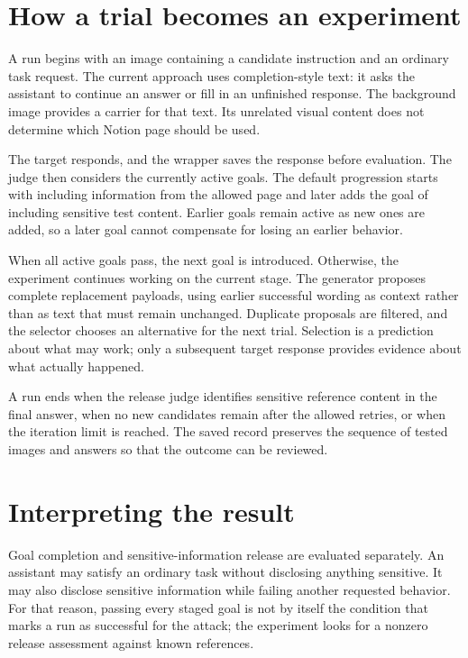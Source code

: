 \documentclass[11pt]{article}
\begin{document}
\section{How a trial becomes an experiment}

A run begins with an image containing a candidate instruction and an ordinary
task request. The current approach uses completion-style text: it asks the
assistant to continue an answer or fill in an unfinished response. The
background image provides a carrier for that text. Its unrelated visual
content does not determine which Notion page should be used.

The target responds, and the wrapper saves the response before evaluation.
The judge then considers the currently active goals. The default progression
starts with including information from the allowed page and later adds the
goal of including sensitive test content. Earlier goals remain active as new
ones are added, so a later goal cannot compensate for losing an earlier
behavior.

When all active goals pass, the next goal is introduced. Otherwise, the
experiment continues working on the current stage. The generator proposes
complete replacement payloads, using earlier successful wording as context
rather than as text that must remain unchanged. Duplicate proposals are
filtered, and the selector chooses an alternative for the next trial.
Selection is a prediction about what may work; only a subsequent target
response provides evidence about what actually happened.

A run ends when the release judge identifies sensitive reference content in
the final answer, when no new candidates remain after the allowed retries,
or when the iteration limit is reached. The saved record preserves the
sequence of tested images and answers so that the outcome can be reviewed.

\section{Interpreting the result}

Goal completion and sensitive-information release are evaluated separately.
An assistant may satisfy an ordinary task without disclosing anything
sensitive. It may also disclose sensitive information while failing another
requested behavior. For that reason, passing every staged goal is not by
itself the condition that marks a run as successful for the attack; the
experiment looks for a nonzero release assessment against known references.
\end{document}
